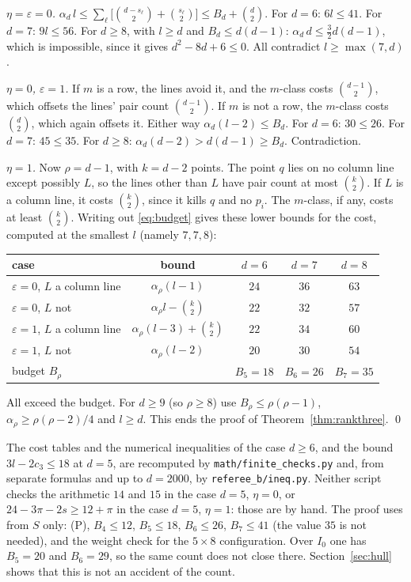 \documentclass[11pt,a4paper]{article}
\theoremstyle{plain}
\theoremstyle{definition}
\newcommand{\Iz}{I_{0}}
\newcommand{\scr}[1]{\nolinkurl{#1}}
\begin{document}
\emph{$\eta=\varepsilon=0$.} $\alpha_{d}\,l\le\sum_{\ell}\bigl[\binom{d-s_{\ell}}{2}+\binom{s_{\ell}}{2}\bigr]\le B_{d}+\binom{d}{2}$. For $d=6$: $6l\le41$. For $d=7$: $9l\le56$. For $d\ge8$, with $l\ge d$ and $B_{d}\le d(d-1)$: $\alpha_{d}\,d\le\tfrac32d(d-1)$, which is impossible, since it gives $d^{2}-8d+6\le0$. All contradict $l\ge\max(7,d)$.

\emph{$\eta=0$, $\varepsilon=1$.} If $m$ is a row, the lines avoid it, and the $m$-class costs $\binom{d-1}{2}$, which offsets the lines' pair count $\binom{d-1}{2}$. If $m$ is not a row, the $m$-class costs $\binom{d}{2}$, which again offsets it. Either way $\alpha_{d}(l-2)\le B_{d}$. For $d=6$: $30\le26$. For $d=7$: $45\le35$. For $d\ge8$: $\alpha_{d}(d-2)>d(d-1)\ge B_{d}$. Contradiction.

\emph{$\eta=1$.} Now $\rho=d-1$, with $k=d-2$ points. The point $q$ lies on no column line except possibly $L$, so the lines other than $L$ have pair count at most $\binom{k}{2}$. If $L$ is a column line, it costs $\binom{k}{2}$, since it kills $q$ and no $p_{i}$. The $m$-class, if any, costs at least $\binom{k}{2}$. Writing out \eqref{eq:budget} gives these lower bounds for the cost, computed at the smallest $l$ (namely $7,7,8$):
\begin{center}
\begin{tabular}{lcccc}
case & bound & $d=6$ & $d=7$ & $d=8$\\\hline
$\varepsilon=0$, $L$ a column line & $\alpha_{\rho}(l-1)$ & $24$ & $36$ & $63$\\
$\varepsilon=0$, $L$ not & $\alpha_{\rho}l-\binom{k}{2}$ & $22$ & $32$ & $57$\\
$\varepsilon=1$, $L$ a column line & $\alpha_{\rho}(l-3)+\binom{k}{2}$ & $22$ & $34$ & $60$\\
$\varepsilon=1$, $L$ not & $\alpha_{\rho}(l-2)$ & $20$ & $30$ & $54$\\\hline
budget $B_{\rho}$ & & $B_{5}=18$ & $B_{6}=26$ & $B_{7}=35$
\end{tabular}
\end{center}
All exceed the budget. For $d\ge9$ (so $\rho\ge8$) use $B_{\rho}\le\rho(\rho-1)$, $\alpha_{\rho}\ge\rho(\rho-2)/4$ and $l\ge d$. This ends the proof of Theorem~\ref{thm:rankthree}. \qed

\medskip
The cost tables and the numerical inequalities of the case $d\ge6$, and the bound $3l-2c_{3}\le18$ at $d=5$, are recomputed by \scr{math/finite_checks.py} and, from separate formulas and up to $d=2000$, by \scr{referee_b/ineq.py}. Neither script checks the arithmetic $14$ and $15$ in the case $d=5$, $\eta=0$, or $24-3\pi-2s\ge12+\pi$ in the case $d=5$, $\eta=1$: those are by hand. The proof uses from $S$ only: (P), $B_{4}\le12$, $B_{5}\le18$, $B_{6}\le26$, $B_{7}\le41$ (the value $35$ is not needed), and the weight check for the $5\times8$ configuration. Over $\Iz$ one has $B_{5}=20$ and $B_{6}=29$, so the same count does not close there. Section~\ref{sec:hull} shows that this is not an accident of the count.
\end{document}
